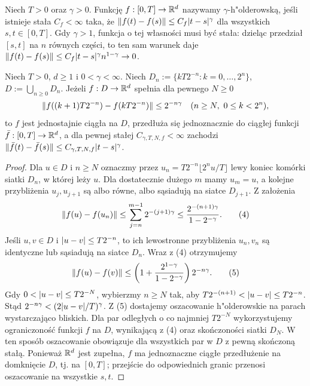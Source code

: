 \begin{definicja}
Niech $T>0$ oraz $\gamma>0$.
Funkcję $f:[0,T]\to\mathbb{R}^d$ nazywamy $\gamma$-h"olderowską,
jeśli istnieje stała $C_f<\infty$ taka, że
$\lVert f(t)-f(s)\rVert\le C_f\lvert t-s\rvert^{\gamma}$
dla wszystkich $s,t\in[0,T]$.
Gdy $\gamma>1$, funkcja o tej własności musi być stała:
dzieląc przedział $[s,t]$ na $n$ równych części,
to ten sam warunek daje
$\lVert f(t)-f(s)\rVert\le C_f\lvert t-s\rvert^{\gamma}n^{1-\gamma}\to0$.
\end{definicja}

\begin{lemat}
\label{lem:dyadyczny}
Niech $T>0$, $d\ge1$ i $0<\gamma<\infty$.
Niech $D_n:=\{kT2^{-n}:k=0,\ldots,2^n\}$,
$D:=\bigcup_{n\ge0}D_n$. Jeżeli $f:D\to\mathbb{R}^d$
spełnia dla pewnego $N\ge0$
\[
\lVert f((k+1)T2^{-n})-f(kT2^{-n})\rVert
\le 2^{-n\gamma}
\quad(n\ge N,\ 0\le k<2^n),
\]
to $f$ jest jednostajnie ciągła na $D$,
przedłuża się jednoznacznie do ciągłej funkcji
$\bar f:[0,T]\to\mathbb{R}^d$, a dla pewnej stałej
$C_{\gamma,T,N,f}<\infty$ zachodzi
$\lVert \bar f(t)-\bar f(s)\rVert\le C_{\gamma,T,N,f}|t-s|^\gamma$.
\end{lemat}
\begin{proof}
Dla $u\in D$ i $n\ge N$ oznaczmy przez
$u_n=T2^{-n}\lfloor 2^n u/T\rfloor$ lewy koniec
komórki siatki $D_n$, w której leży $u$.
Dla dostatecznie dużego $m$ mamy $u_m=u$,
a kolejne przybliżenia $u_j,u_{j+1}$ są albo równe,
albo sąsiadują na siatce $D_{j+1}$. Z założenia
\[
\lVert f(u)-f(u_n)\rVert
\le\sum_{j=n}^{m-1}2^{-(j+1)\gamma}
\le\frac{2^{-(n+1)\gamma}}{1-2^{-\gamma}}.
\tag{4}
\]
Jeśli $u,v\in D$ i $\lvert u-v\rvert\le T2^{-n}$,
to ich lewostronne przybliżenia $u_n,v_n$
są identyczne lub sąsiadują na siatce $D_n$.
Wraz z (4) otrzymujemy
\[
\lVert f(u)-f(v)\rVert\le
\left(1+\frac{2^{1-\gamma}}{1-2^{-\gamma}}\right)
2^{-n\gamma}.
\tag{5}
\]
Gdy $0<\lvert u-v\rvert\le T2^{-N}$, wybierzmy $n\ge N$
tak, aby $T2^{-(n+1)}<\lvert u-v\rvert\le T2^{-n}$.
Stąd $2^{-n\gamma}<(2\lvert u-v\rvert/T)^\gamma$.
Z (5) dostajemy oszacowanie h"olderowskie na parach
wystarczająco bliskich. Dla par odległych o co najmniej
$T2^{-N}$ wykorzystujemy ograniczoność funkcji $f$ na
$D$, wynikającą z (4) oraz skończoności siatki $D_N$.
W ten sposób oszacowanie obowiązuje dla wszystkich par
w $D$ z pewną skończoną stałą. Ponieważ $\mathbb{R}^d$ jest
zupełna, $f$ ma jednoznaczne ciągłe przedłużenie
na domknięcie $D$, tj. na $[0,T]$; przejście do
odpowiednich granic przenosi oszacowanie na wszystkie $s,t$.
\end{proof}

